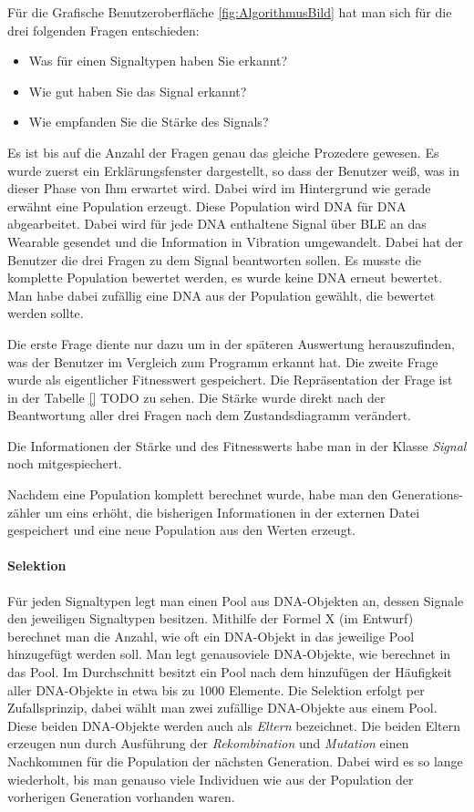 Für die Grafische Benutzeroberfläche \autoref{fig:AlgorithmusBild} hat man sich für die drei folgenden Fragen entschieden:
\begin{itemize}
\item Was für einen Signaltypen haben Sie erkannt?
\item Wie gut haben Sie das Signal erkannt?
\item Wie empfanden Sie die Stärke des Signals?
\end{itemize}

Es ist bis auf die Anzahl der Fragen genau das gleiche Prozedere gewesen. Es wurde zuerst ein Erklärungsfenster dargestellt, so dass der Benutzer weiß, was in dieser Phase von Ihm erwartet wird. 
Dabei wird im Hintergrund wie gerade erwähnt eine Population erzeugt. Diese Population wird DNA für DNA abgearbeitet. Dabei wird für jede DNA enthaltene Signal über BLE an das Wearable gesendet und die Information in Vibration umgewandelt. Dabei hat der Benutzer die drei Fragen zu dem Signal beantworten sollen. 
Es musste die komplette Population bewertet werden, es wurde keine DNA erneut bewertet. Man habe dabei zufällig eine DNA aus der Population gewählt, die bewertet werden sollte.

Die erste Frage diente nur dazu um in der späteren Auswertung herauszufinden, was der Benutzer im Vergleich zum Programm erkannt hat. 
Die zweite Frage wurde als eigentlicher Fitnesswert gespeichert. Die Repräsentation der Frage ist in der Tabelle \autoref{} TODO zu sehen.
Die Stärke wurde direkt nach der Beantwortung aller drei Fragen nach dem Zustandsdiagramm verändert.

Die Informationen der Stärke und des Fitnesswerts habe man in der Klasse \textit{Signal} noch mitgespiechert.

Nachdem eine Population komplett berechnet wurde, habe man den Generations-zähler um eins erhöht, die bisherigen Informationen in der externen Datei gespeichert und eine neue Population aus den Werten erzeugt.

\paragraph{Selektion}
Für jeden Signaltypen legt man einen Pool aus DNA-Objekten an, dessen Signale den jeweiligen Signaltypen besitzen.
Mithilfe der Formel X (im Entwurf) berechnet man die Anzahl, wie oft ein DNA-Objekt in das jeweilige Pool hinzugefügt werden soll. Man legt genausoviele DNA-Objekte, wie berechnet in das Pool. 
Im Durchschnitt besitzt ein Pool nach dem hinzufügen der Häufigkeit aller DNA-Objekte in etwa bis zu 1000 Elemente.
Die Selektion erfolgt per Zufallsprinzip, dabei wählt man zwei zufällige DNA-Objekte aus einem Pool. Diese beiden DNA-Objekte werden auch als \textit{Eltern} bezeichnet. Die beiden Eltern erzeugen nun durch Ausführung der \textit{Rekombination} und \textit{Mutation} einen Nachkommen für die Population der nächsten Generation. Dabei wird es so lange wiederholt, bis man genauso viele Individuen wie aus der Population der vorherigen Generation vorhanden waren.

